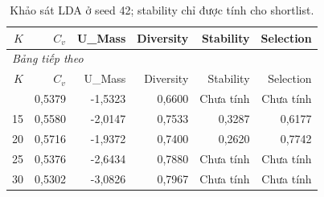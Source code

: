 \begingroup\small\setlength{\tabcolsep}{4pt}\renewcommand{\arraystretch}{1.16}
\begin{longtable}{rrrrrr}
\caption{Khảo sát LDA ở seed 42; stability chỉ được tính cho shortlist.}\label{tab:lda-grid}\\
\toprule $K$ & $C_v$ & U\_Mass & Diversity & Stability & Selection \\
\midrule\endfirsthead
\multicolumn{6}{l}{\textit{Bảng tiếp theo}}\\
\toprule $K$ & $C_v$ & U\_Mass & Diversity & Stability & Selection \\
\midrule\endhead
\bottomrule\endfoot
10 & 0,5379 & -1,5323 & 0,6600 & Chưa tính & Chưa tính \\
15 & 0,5580 & -2,0147 & 0,7533 & 0,3287 & 0,6177 \\
20 & 0,5716 & -1,9372 & 0,7400 & 0,2620 & 0,7742 \\
25 & 0,5376 & -2,6434 & 0,7880 & Chưa tính & Chưa tính \\
30 & 0,5302 & -3,0826 & 0,7967 & Chưa tính & Chưa tính \\
\end{longtable}\endgroup
{}
